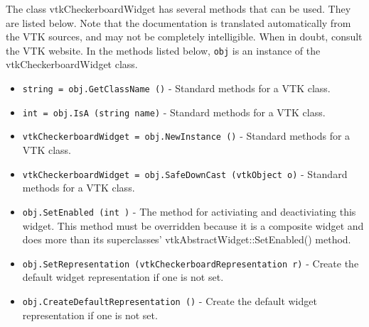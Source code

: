 The class vtkCheckerboardWidget has several methods that can be used.
  They are listed below.
Note that the documentation is translated automatically from the VTK sources,
and may not be completely intelligible.  When in doubt, consult the VTK website.
In the methods listed below, \verb|obj| is an instance of the vtkCheckerboardWidget class.
\begin{itemize}
\item  \verb|string = obj.GetClassName ()| -  Standard methods for a VTK class.

\item  \verb|int = obj.IsA (string name)| -  Standard methods for a VTK class.

\item  \verb|vtkCheckerboardWidget = obj.NewInstance ()| -  Standard methods for a VTK class.

\item  \verb|vtkCheckerboardWidget = obj.SafeDownCast (vtkObject o)| -  Standard methods for a VTK class.

\item  \verb|obj.SetEnabled (int )| -  The method for activiating and deactiviating this widget. This method
 must be overridden because it is a composite widget and does more than
 its superclasses' vtkAbstractWidget::SetEnabled() method.

\item  \verb|obj.SetRepresentation (vtkCheckerboardRepresentation r)| -  Create the default widget representation if one is not set. 

\item  \verb|obj.CreateDefaultRepresentation ()| -  Create the default widget representation if one is not set. 

\end{itemize}
